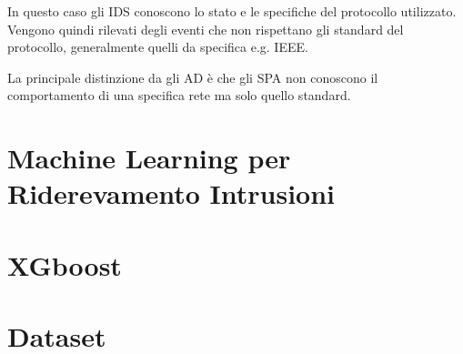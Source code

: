 In questo caso gli IDS conoscono lo stato e le specifiche del protocollo utilizzato. Vengono quindi rilevati degli eventi che non rispettano gli standard del protocollo, generalmente quelli da specifica e.g. IEEE.

La principale distinzione da gli AD è che gli SPA non conoscono il comportamento di una specifica rete ma solo quello standard.

\section{Machine Learning per Riderevamento Intrusioni}


\section{XGboost}


\section{Dataset}



